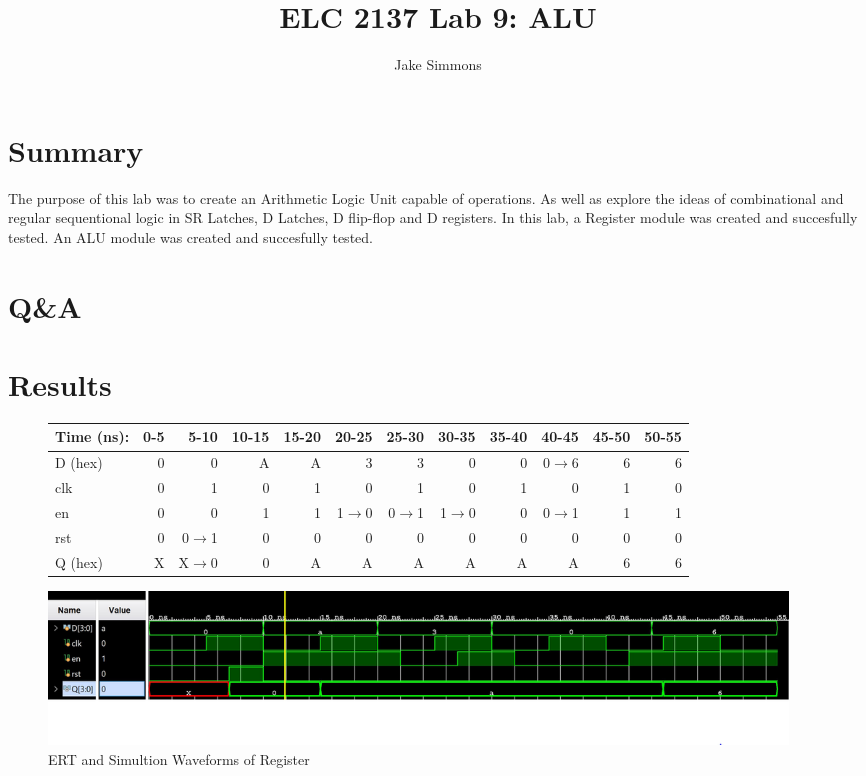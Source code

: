 \documentclass[11pt]{article}
\begin{document}
\title{ELC 2137 Lab 9: ALU}
\author{Jake Simmons}

\maketitle


\section*{Summary}

The purpose of this lab was to create an Arithmetic Logic Unit capable of operations. As well as explore the ideas of combinational and regular sequentional logic in SR Latches, D Latches, D flip-flop and D registers. In this lab, a Register module was created and succesfully tested. An ALU module was created and succesfully tested.  


\section*{Q\&A}



\section*{Results}

\begin{figure}[ht]\centering
	\begin{tabular}{l|rrrrrrrrrrr}
		Time (ns): & 0-5 & 5-10 & 10-15 & 15-20 & 20-25 & 25-30 & 30-35 & 35-40 & 40-45 & 45-50 & 50-55 \\
		\midrule
		D (hex) & 0 & 0 & A & A & 3 & 3 & 0 & 0 & 0$\rightarrow$6 & 6 & 6 \\
		clk & 0 & 1 & 0 & 1 & 0 & 1 & 0 & 1 & 0 & 1 & 0  \\
		en & 0 & 0 & 1 & 1 & 1$\rightarrow$0 & 0$\rightarrow$1 & 1$\rightarrow$0 & 0 & 0$\rightarrow$1 & 1 & 1 \\
		rst & 0 & 0$\rightarrow$1 & 0 & 0 & 0 & 0 & 0 & 0 & 0 & 0 & 0 \\
		\midrule 
		Q (hex) & X & X$\rightarrow$0 & 0 & A & A & A & A & A & A & 6 & 6 \\
		\bottomrule
	\end{tabular}\medskip
	
	\includegraphics[width=0.95\textwidth]{register_test.JPG}
	\caption{ERT and Simultion Waveforms of Register}
	\label{fig:sim_with_table}
\end{figure}
\end{document}
